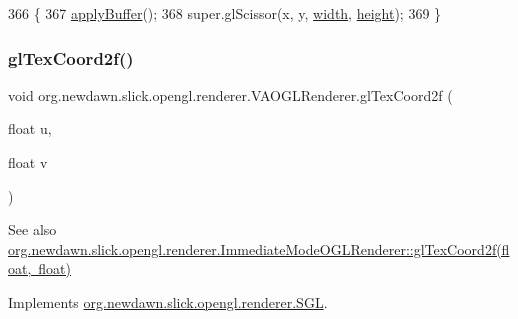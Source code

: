 \begin{DoxyCode}
366                                                                \{
367         \mbox{\hyperlink{classorg_1_1newdawn_1_1slick_1_1opengl_1_1renderer_1_1_v_a_o_g_l_renderer_a7c5d09419cd40761be8f849631aebab5}{applyBuffer}}();
368         super.glScissor(x, y, \mbox{\hyperlink{classorg_1_1newdawn_1_1slick_1_1opengl_1_1renderer_1_1_immediate_mode_o_g_l_renderer_a65d0a04d747368ea954f69074d9102d6}{width}}, \mbox{\hyperlink{classorg_1_1newdawn_1_1slick_1_1opengl_1_1renderer_1_1_immediate_mode_o_g_l_renderer_aec68994a0ee3b7b478122af823c8a8d7}{height}});
369     \}
\end{DoxyCode}
\mbox{\label{classorg_1_1newdawn_1_1slick_1_1opengl_1_1renderer_1_1_v_a_o_g_l_renderer_af0cb344d4b0374c1f6ee17dd37ecfc15}} 
\subsubsection{\texorpdfstring{gl\+Tex\+Coord2f()}{glTexCoord2f()}}
{\footnotesize\ttfamily void org.\+newdawn.\+slick.\+opengl.\+renderer.\+V\+A\+O\+G\+L\+Renderer.\+gl\+Tex\+Coord2f (\begin{DoxyParamCaption}\item[{float}]{u,  }\item[{float}]{v }\end{DoxyParamCaption})\hspace{0.3cm}{\ttfamily [inline]}}

\begin{DoxySeeAlso}{See also}
\mbox{\hyperlink{classorg_1_1newdawn_1_1slick_1_1opengl_1_1renderer_1_1_immediate_mode_o_g_l_renderer_a12f389fdfcea07900618c8c5a219092a}{org.\+newdawn.\+slick.\+opengl.\+renderer.\+Immediate\+Mode\+O\+G\+L\+Renderer\+::gl\+Tex\+Coord2f(float, float)}} 
\end{DoxySeeAlso}


Implements \mbox{\hyperlink{interfaceorg_1_1newdawn_1_1slick_1_1opengl_1_1renderer_1_1_s_g_l_a5f661318cf9926c586a9837d0ded9fbd}{org.\+newdawn.\+slick.\+opengl.\+renderer.\+S\+GL}}.


